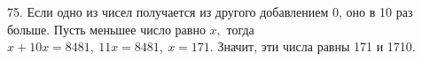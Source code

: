 75. Если одно из чисел получается из другого добавлением 0, оно в 10 раз больше. Пусть меньшее число равно $x,$ тогда $x+10x=8481,\ 11x=8481,\ x=171.$ Значит, эти числа равны 171 и 1710.\\
